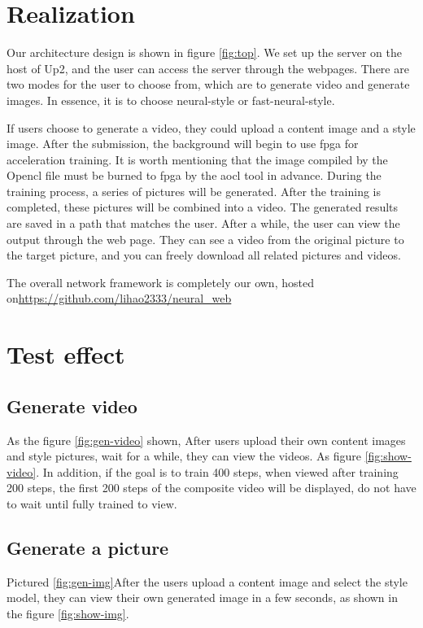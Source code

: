 \section{Realization}

Our architecture design is shown in figure \ref{fig:top}. We set up the server on the host of Up2, and the user can access the server through the webpages.
There are two modes for the user to choose from, which are to generate video and generate images. In essence, it is to choose neural-style or fast-neural-style.

If users choose to generate a video, they could upload a content image and a style image.
After the submission, the background will begin to use fpga for acceleration training. It is worth mentioning that the image compiled by the Opencl file must be burned to fpga by the aocl tool in advance.
During the training process, a series of pictures will be generated. After the training is completed, these pictures will be combined into a video.
The generated results are saved in a path that matches the user. After a while, the user can view the output through the web page.
They can see a video from the original picture to the target picture, and you can freely download all related pictures and videos.

The overall network framework is completely our own, hosted on\url{https://github.com/lihao2333/neural_web}

\section{Test effect}
\subsection{Generate video}
As the figure \ref{fig:gen-video} shown, After users upload their own content images and style pictures, wait for a while, they can view the videos. As figure \ref{fig:show-video}.
In addition, if the goal is to train 400 steps, when viewed after training 200 steps, the first 200 steps of the composite video will be displayed, do not have to wait until fully trained to view.
\subsection{Generate a picture}
Pictured \ref{fig:gen-img}After the users upload a content image and select the style model, they can view their own generated image in a few seconds, as shown in the figure \ref{fig:show-img}.
